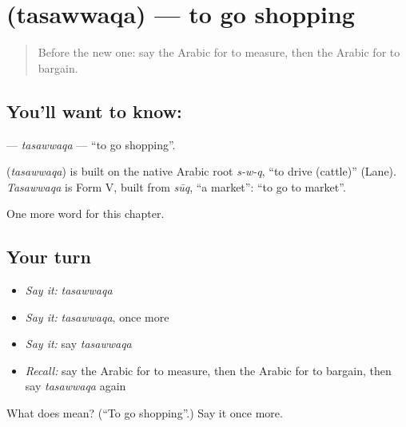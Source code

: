 \section[\texorpdfstring{\ar{تسوق} (tasawwaqa)}{تسوق (tasawwaqa)}]{ (tasawwaqa) — to go shopping}

\label{lesson:AR-C193-tasawwaqa}



\begin{quote}
Before the new one: say the Arabic for to measure, then the Arabic for to bargain.
\end{quote}

\subsection*{You'll want to know: }
\textbf{} — \emph{tasawwaqa} — \textquotedblleft{}to go shopping\textquotedblright{}.

\begin{cousinweb}
\textbf{} (\emph{tasawwaqa}) is built on the native Arabic root \emph{s-w-q}, \textquotedblleft{}to drive (cattle)\textquotedblright{} (Lane). \emph{Tasawwaqa} is Form V, built from \emph{sūq}, \textquotedblleft{}a market\textquotedblright{}: \textquotedblleft{}to go to market\textquotedblright{}.
\end{cousinweb}

\begin{grammarlens}[title={What you've built}]
One more word for this chapter.
\end{grammarlens}

\subsection*{Your turn}
\begin{itemize}
\raggedright
  \item \emph{Say it:} \emph{tasawwaqa}
  \item \emph{Say it:} \emph{tasawwaqa}, once more
  \item \emph{Say it:} say \emph{tasawwaqa}
  \item \emph{Recall:} say the Arabic for to measure, then the Arabic for to bargain, then say \emph{tasawwaqa} again
\end{itemize}

\begin{tcolorbox}[breakable,colback=teal!4,colframe=teal!35!black,title={Before you move on}]
What does  mean? (\textquotedblleft{}To go shopping\textquotedblright{}.) Say it once more.
\end{tcolorbox}
